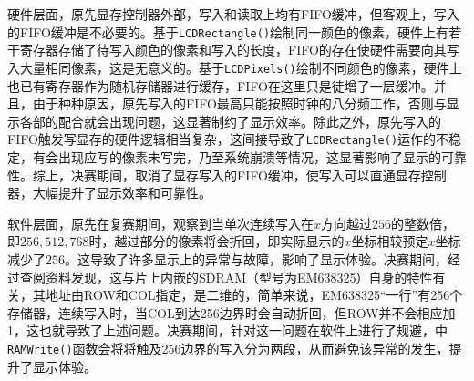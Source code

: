 硬件层面，原先显存控制器外部，写入和读取上均有FIFO缓冲，但客观上，写入的FIFO缓冲是不必要的。基于\texttt{LCDRectangle()}绘制同一颜色的像素，硬件上有若干寄存器存储了待写入颜色的像素和写入的长度，FIFO的存在使硬件需要向其写入大量相同像素，这是无意义的。基于\texttt{LCDPixels()}绘制不同颜色的像素，硬件上也已有寄存器作为随机存储器进行缓存，FIFO在这里只是徒增了一层缓冲。并且，由于种种原因，原先写入的FIFO最高只能按照时钟的八分频工作，否则与显示各部的配合就会出现问题，这显著制约了显示效率。除此之外，原先写入的FIFO触发写显存的硬件逻辑相当复杂，这间接导致了\texttt{LCDRectangle()}运作的不稳定，有会出现应写的像素未写完，乃至系统崩溃等情况，这显著影响了显示的可靠性。综上，决赛期间，取消了显存写入的FIFO缓冲，使写入可以直通显存控制器，大幅提升了显示效率和可靠性。

软件层面，原先在复赛期间，观察到当单次连续写入在$x$方向越过$256$的整数倍，即$256, 512, 768$时，越过部分的像素将会折回，即实际显示的$x$坐标相较预定$x$坐标减少了$256$。这导致了许多显示上的异常与故障，影响了显示体验。决赛期间，经过查阅资料发现，这与片上内嵌的SDRAM（型号为EM638325）自身的特性有关，其地址由ROW和COL指定，是二维的，简单来说，EM638325“一行”有256个存储器，连续写入时，当COL到达256边界时会自动折回，但ROW并不会相应加1，这也就导致了上述问题。决赛期间，针对这一问题在软件上进行了规避，中\texttt{RAMWrite()}函数会将将触及256边界的写入分为两段，从而避免该异常的发生，提升了显示体验。